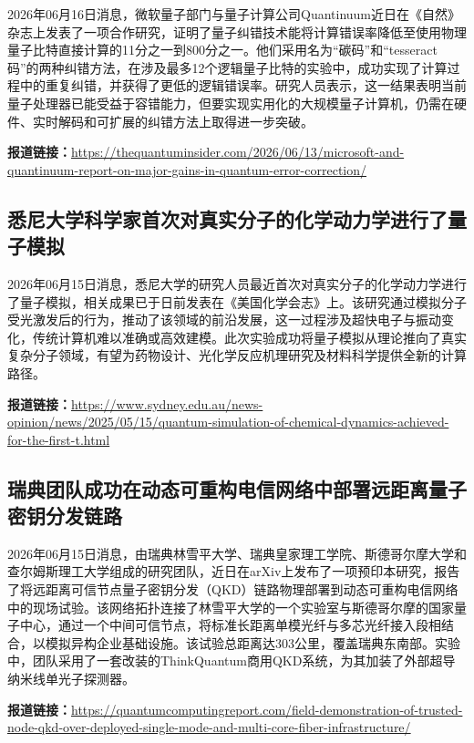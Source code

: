 \documentclass[12pt,a4paper]{ctexart}
\begin{document}
2026年06月16日消息，微软量子部门与量子计算公司Quantinuum近日在《自然》杂志上发表了一项合作研究，证明了量子纠错技术能将计算错误率降低至使用物理量子比特直接计算的11分之一到800分之一。他们采用名为“碳码”和“tesseract码”的两种纠错方法，在涉及最多12个逻辑量子比特的实验中，成功实现了计算过程中的重复纠错，并获得了更低的逻辑错误率。研究人员表示，这一结果表明当前量子处理器已能受益于容错能力，但要实现实用化的大规模量子计算机，仍需在硬件、实时解码和可扩展的纠错方法上取得进一步突破。

\noindent\textbf{报道链接：}\url{https://thequantuminsider.com/2026/06/13/microsoft-and-quantinuum-report-on-major-gains-in-quantum-error-correction/}

\subsection{ 悉尼大学科学家首次对真实分子的化学动力学进行了量子模拟 }

2026年06月15日消息，悉尼大学的研究人员最近首次对真实分子的化学动力学进行了量子模拟，相关成果已于日前发表在《美国化学会志》上。该研究通过模拟分子受光激发后的行为，推动了该领域的前沿发展，这一过程涉及超快电子与振动变化，传统计算机难以准确或高效建模。此次实验成功将量子模拟从理论推向了真实复杂分子领域，有望为药物设计、光化学反应机理研究及材料科学提供全新的计算路径。

\noindent\textbf{报道链接：}\url{https://www.sydney.edu.au/news-opinion/news/2025/05/15/quantum-simulation-of-chemical-dynamics-achieved-for-the-first-t.html}

\subsection{ 瑞典团队成功在动态可重构电信网络中部署远距离量子密钥分发链路 }

2026年06月15日消息，由瑞典林雪平大学、瑞典皇家理工学院、斯德哥尔摩大学和查尔姆斯理工大学组成的研究团队，近日在arXiv上发布了一项预印本研究，报告了将远距离可信节点量子密钥分发（QKD）链路物理部署到动态可重构电信网络中的现场试验。该网络拓扑连接了林雪平大学的一个实验室与斯德哥尔摩的国家量子中心，通过一个中间可信节点，将标准长距离单模光纤与多芯光纤接入段相结合，以模拟异构企业基础设施。该试验总距离达303公里，覆盖瑞典东南部。实验中，团队采用了一套改装的ThinkQuantum商用QKD系统，为其加装了外部超导纳米线单光子探测器。

\noindent\textbf{报道链接：}\url{https://quantumcomputingreport.com/field-demonstration-of-trusted-node-qkd-over-deployed-single-mode-and-multi-core-fiber-infrastructure/}
\end{document}
